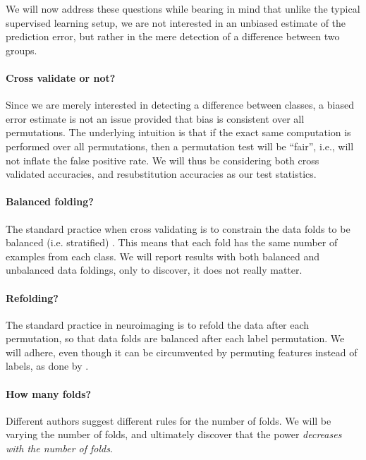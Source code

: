 \documentclass[12pt,a4paper]{article}
\theoremstyle{definition}
\begin{document}
We will now address these questions while bearing in mind that unlike the typical supervised learning setup, we are not interested in an unbiased estimate of the prediction error, but rather in the mere detection of a difference between two groups. 


\paragraph{Cross validate or not?}
Since we are merely interested in detecting a difference between classes, a biased error estimate is not an issue provided that bias is consistent over all permutations. 
The underlying intuition is that if the exact same computation is performed over all permutations, then a permutation test will be ``fair'', i.e., will not inflate the false positive rate. 
We will thus be considering both cross validated accuracies, and resubstitution accuracies as our test statistics. 


\paragraph{Balanced folding?}
The standard practice when cross validating is to constrain the data folds to be balanced (i.e. stratified) \citep[e.g.][]{ojala_permutation_2010}.
This means that each fold has the same number of examples from each class. 
We will report results with both balanced and unbalanced data foldings, only to discover, it does not really matter. 


\paragraph{Refolding?}
The standard practice in neuroimaging is to refold the data after each permutation, so that data folds are balanced after each label permutation.
We will adhere, even though it can be circumvented by permuting features instead of labels, as done by \citet{golland_permutation_2005}.


\paragraph{How many folds?}
Different authors suggest different rules for the number of folds. 
We will be varying the number of folds, and ultimately discover that the power \emph{decreases with the number of folds}. 
\end{document}
